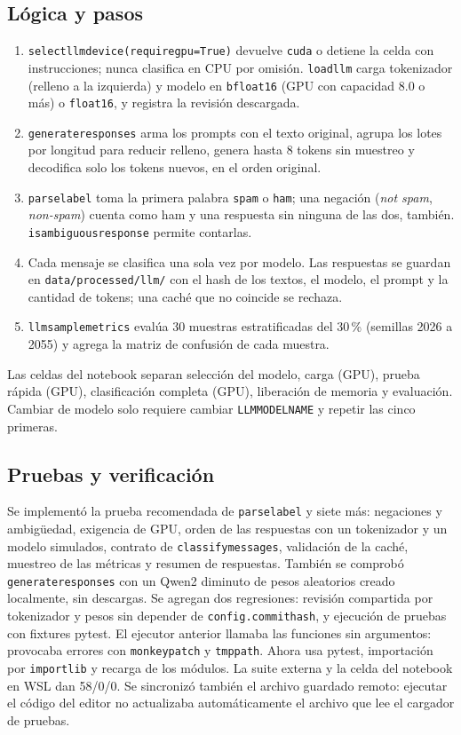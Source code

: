 \documentclass[11pt,letterpaper]{article}
\renewcommand{\_}{\originalunderscore\allowbreak}
\begin{document}
\subsection{Lógica y pasos}
\begin{enumerate}
\item \texttt{select\_llm\_device(require\_gpu=True)} devuelve
\texttt{cuda} o detiene la celda con instrucciones; nunca clasifica en CPU
por omisión. \texttt{load\_llm} carga tokenizador (relleno a la izquierda)
y modelo en \texttt{bfloat16} (GPU con capacidad 8.0 o más) o
\texttt{float16}, y registra la revisión descargada.
\item \texttt{generate\_responses} arma los prompts con el texto original,
agrupa los lotes por longitud para reducir relleno, genera hasta 8 tokens
sin muestreo y decodifica solo los tokens nuevos, en el orden original.
\item \texttt{parse\_label} toma la primera palabra \texttt{spam} o
\texttt{ham}; una negación (\emph{not spam}, \emph{non-spam}) cuenta como
ham y una respuesta sin ninguna de las dos, también.
\texttt{is\_ambiguous\_response} permite contarlas.
\item Cada mensaje se clasifica una sola vez por modelo. Las respuestas se
guardan en \texttt{data/processed/llm/} con el hash de los textos, el modelo,
el prompt y la cantidad de tokens; una caché que no coincide se rechaza.
\item \texttt{llm\_sample\_metrics} evalúa 30 muestras estratificadas del
30\,\% (semillas 2026 a 2055) y agrega la matriz de confusión de cada muestra.
\end{enumerate}

Las celdas del notebook separan selección del modelo, carga (GPU), prueba
rápida (GPU), clasificación completa (GPU), liberación de memoria y
evaluación. Cambiar de modelo solo requiere cambiar
\texttt{LLM\_MODEL\_NAME} y repetir las cinco primeras.

\subsection{Pruebas y verificación}
Se implementó la prueba recomendada de \texttt{parse\_label} y siete más:
negaciones y ambigüedad, exigencia de GPU, orden de las respuestas con un
tokenizador y un modelo simulados, contrato de \texttt{classify\_messages},
validación de la caché, muestreo de las métricas y resumen de respuestas.
También se comprobó \texttt{generate\_responses} con un Qwen2 diminuto de
pesos aleatorios creado localmente, sin descargas. Se agregan dos regresiones:
revisión compartida por tokenizador y pesos sin depender de
\texttt{config.\_commit\_hash}, y ejecución de pruebas con fixtures pytest.
El ejecutor anterior llamaba las funciones sin argumentos: provocaba errores
con \texttt{monkeypatch} y \texttt{tmp\_path}. Ahora usa pytest, importación
por \texttt{importlib} y recarga de los módulos. La suite externa y la celda
del notebook en WSL dan 58/0/0. Se sincronizó también el archivo guardado
remoto: ejecutar el código del editor no actualizaba automáticamente el
archivo que lee el cargador de pruebas.
\end{document}
